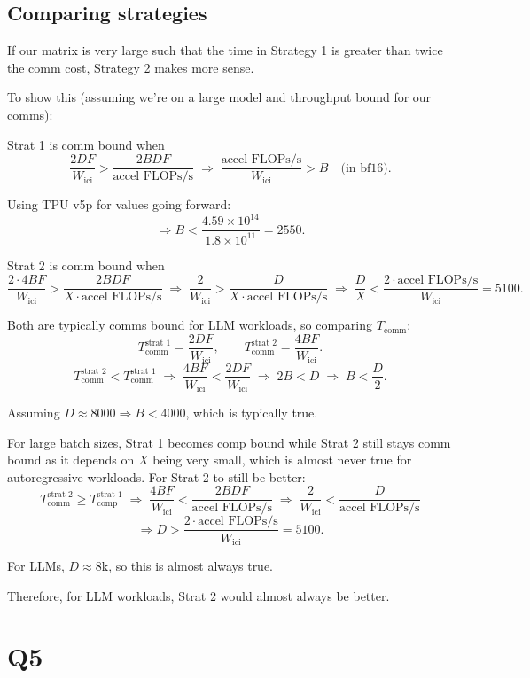 \documentclass[11pt]{article}
\newcommand{\flopss}{\text{FLOPs/s}}
\newcommand{\Tcomm}{T_{\text{comm}}}
\newcommand{\Tcomp}{T_{\text{comp}}}
\newcommand{\Wici}{W_{\text{ici}}}
\begin{document}
\subsection*{Comparing strategies}

If our matrix is very large such that the time in Strategy 1 is greater than twice the comm cost, Strategy 2 makes more sense.

To show this (assuming we're on a large model and throughput bound for our comms):

Strat 1 is comm bound when
\[
\frac{2DF}{\Wici} > \frac{2BDF}{\text{accel }\flopss}
\;\Rightarrow\;
\frac{\text{accel }\flopss}{\Wici} > B \quad \text{(in bf16)}.
\]

Using TPU v5p for values going forward:
\[
\Rightarrow B < \frac{4.59 \times 10^{14}}{1.8 \times 10^{11}} = 2550.
\]

Strat 2 is comm bound when
\[
\frac{2 \cdot 4BF}{\Wici} > \frac{2BDF}{X \cdot \text{accel }\flopss}
\;\Rightarrow\; \frac{2}{\Wici} > \frac{D}{X \cdot \text{accel }\flopss}
\;\Rightarrow\; \frac{D}{X} < \frac{2 \cdot \text{accel }\flopss}{\Wici} = 5100.
\]

Both are typically comms bound for LLM workloads, so comparing $\Tcomm$:
\[
\Tcomm^{\text{strat 1}} = \frac{2DF}{\Wici}, \qquad \Tcomm^{\text{strat 2}} = \frac{4BF}{\Wici}.
\]
\[
\Tcomm^{\text{strat 2}} < \Tcomm^{\text{strat 1}}
\;\Rightarrow\; \frac{4BF}{\Wici} < \frac{2DF}{\Wici}
\;\Rightarrow\; 2B < D \;\Rightarrow\; B < \frac{D}{2}.
\]

Assuming $D \approx 8000 \Rightarrow B < 4000$, which is typically true.

For large batch sizes, Strat 1 becomes comp bound while Strat 2 still stays comm bound as it depends on $X$ being very small, which is almost never true for autoregressive workloads. For Strat 2 to still be better:
\[
\Tcomm^{\text{strat 2}} \geq \Tcomp^{\text{strat 1}}
\;\Rightarrow\; \frac{4BF}{\Wici} < \frac{2BDF}{\text{accel }\flopss}
\;\Rightarrow\; \frac{2}{\Wici} < \frac{D}{\text{accel }\flopss}
\]
\[
\Rightarrow D > \frac{2 \cdot \text{accel }\flopss}{\Wici} = 5100.
\]

For LLMs, $D \approx 8\text{k}$, so this is almost always true.

Therefore, for LLM workloads, Strat 2 would almost always be better.

\section*{Q5}
\end{document}
